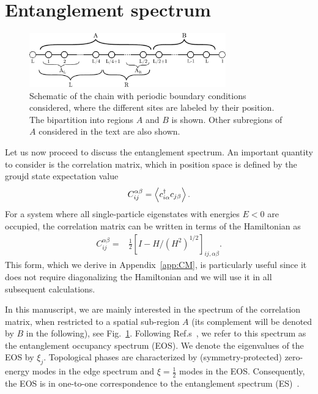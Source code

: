 \documentclass[twocolumn,amsmath,longbibliography,amssymb,superscriptaddress]{revtex4-1}
\begin{document}
\section{Entanglement spectrum}
\label{section:ES}

\begin{figure}[t]
	\centering
	\includegraphics[width=85mm]{chain.pdf}
	\caption{Schematic of the chain with periodic boundary conditions considered, where the different sites are labeled by their position. The bipartition into regions $A$ and $B$ is shown. Other subregions of $A$ considered in the text are also shown. }
\label{fig:chain}
\end{figure}


Let us now proceed to discuss the entanglement spectrum. 
An important quantity to consider is the correlation matrix, which in position space is defined by the groujd state expectation value
\begin{align}
C_{ij}^{\alpha \beta} = \expval{c_{i\alpha}^\dagger c_{j\beta}}.
\end{align}
For a system where all single-particle eigenstates with energies $E<0$ are occupied, the correlation matrix can be written  in terms of the Hamiltonian as
\begin{align}\label{eq:corr_mat2}
C_{ij}^{\alpha \beta} =& \frac{1}{2}\left[I - H/ (H^2)^{1/2} \right]_{ij, \alpha \beta}.
\end{align}
This form, which we derive in Appendix~\ref{app:CM}, is particularly useful since it does not require diagonalizing the Hamiltonian and we will use it in all subsequent calculations.

In this manuscript, we are mainly interested in the spectrum of the correlation matrix, when restricted to a spatial sub-region $A$ (its complement will be denoted by $B$ in the following), see Fig.~\ref{fig:chain}. 
Following Ref.s~\cite{Huang2012,Huang2012-2}, we refer to this spectrum as the entanglement occupancy spectrum (EOS).
We denote the eigenvalues of the EOS by $\xi_j$. 
Topological phases are characterized by (symmetry-protected) zero-energy modes in the edge spectrum and $\xi=\frac 1 2$ modes in the EOS. 
Consequently, the EOS is in one-to-one correspondence to the entanglement spectrum (ES)~\cite{Fidkowski2010entanglement}. 
\end{document}
